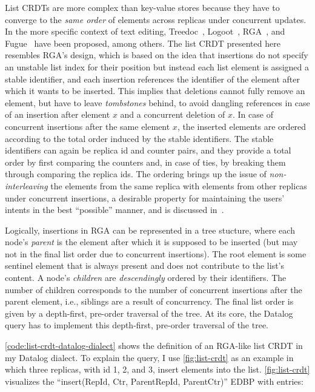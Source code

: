 List \acp{CRDT} are more complex than key-value stores because they have to
converge to the \emph{same order} of elements across replicas under concurrent
updates.
In the more specific context of text editing, Treedoc~\cite{treedoc},
Logoot~\cite{logoot}, RGA~\cite{rga}, and Fugue~\cite{fugue} have been proposed,
among others.
The list \ac{CRDT} presented here resembles RGA's design,
which is based on the idea that insertions do not specify an unstable list index
for their position but instead each list element is assigned a stable identifier,
and each insertion references the identifier of the element after which it wants
to be inserted.
This implies that deletions cannot fully remove an element, but have to leave
\emph{tombstones} behind, to avoid dangling references in case of an
insertion after element \(x\) and a concurrent deletion of \(x\).
In case of concurrent insertions after the same element \(x\),
the inserted elements are ordered according to the total order induced
by the stable identifiers.
The stable identifiers can again be replica id and counter pairs,
and they provide a total order by first comparing the counters and,
in case of ties, by breaking them through comparing the replica ids.
The ordering brings up the issue of \emph{non-interleaving} the elements from
the same replica with elements from other replicas under concurrent insertions,
a desirable property for maintaining the users' intents in the best
``possible'' manner, and is discussed in~\cite{fugue}.

Logically, insertions in RGA can be represented in a tree stucture,
where each node's \emph{parent} is the element after which it is supposed to be
inserted (but may not in the final list order due to concurrent insertions).
The root element is some sentinel element that is always present and does not
contribute to the list's content.
A node's \emph{children} are \emph{descendingly} ordered by their identifiers.
The number of children corresponds to the number of concurrent insertions
after the parent element, i.e., siblings are a result of concurrency.
The final list order is given by a depth-first, pre-order traversal of the tree.
At its core, the Datalog query has to implement this depth-first, pre-order
traversal of the tree.



\ref{code:list-crdt-datalog-dialect} shows the definition of an RGA-like
list \ac{CRDT} in my Datalog dialect.
To explain the query, I use \ref{fig:list-crdt} as an example in which
three replicas, with id 1, 2, and 3, insert elements into the list.
\ref{fig:list-crdt} visualizes the ``insert(RepId, Ctr, ParentRepId, ParentCtr)''
\ac{EDBP} with entries:

